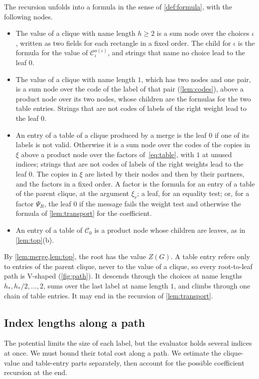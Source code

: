 \documentclass[11pt]{article}
\theoremstyle{definition}
\theoremstyle{definition}
\theoremstyle{remark}
\begin{document}
The recursion unfolds into a formula in the sense of \cref{def:formula}, with the following nodes.
\begin{itemize}[itemsep=1pt]
\item The value of a clique with name length $h\ge2$ is a sum node over the choices $\iota$, written as two fields for each rectangle in a fixed order. The child for $\iota$ is the formula for the value of $\mathcal C^{o(\iota)}_\iota$, and strings that name no choice lead to the leaf $0$.
\item The value of a clique with name length $1$, which has two nodes and one pair, is a sum node over the code of the label of that pair (\cref{lem:codes}), above a product node over its two nodes, whose children are the formulas for the two table entries. Strings that are not codes of labels of the right weight lead to the leaf $0$.
\item An entry of a table of a clique produced by a merge is the leaf $0$ if one of its labels is not valid. Otherwise it is a sum node over the codes of the copies in $\xi$ above a product node over the factors of~\eqref{eq:table}, with $1$ at unused indices; strings that are not codes of labels of the right weights lead to the leaf $0$. The copies in $\xi$ are listed by their nodes and then by their partners, and the factors in a fixed order. A factor is the formula for an entry of a table of the parent clique, at the argument $\xi_v$; a leaf, for an equality test; or, for a factor $\Psi_R$, the leaf $0$ if the message fails the weight test and otherwise the formula of \cref{lem:transport} for the coefficient.
\item An entry of a table of $\mathcal C_0$ is a product node whose children are leaves, as in \cref{lem:top}(b).
\end{itemize}
By \cref{lem:merge,lem:top}, the root has the value $Z(G)$. A table entry refers only to entries of the parent clique, never to the value of a clique, so every root-to-leaf path is V-shaped (\cref{fig:path}). It descends through the choices at name lengths $h_*,h_*/2,\dots,2$, sums over the last label at name length $1$, and climbs through one chain of table entries. It may end in the recursion of \cref{lem:transport}.

\subsection{Index lengths along a path}\label{sec:indexlengths}

The potential limits the size of each label, but the evaluator holds several indices at once. We must bound their total cost along a path. We estimate the clique-value and table-entry parts separately, then account for the possible coefficient recursion at the end.
\end{document}
